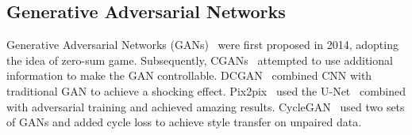 \documentclass[letterpaper]{article} %
\begin{document}











	\subsection{Generative Adversarial Networks}
Generative Adversarial Networks (GANs)~\cite{goodfellow2014generative} were first proposed in 2014, adopting the idea of zero-sum game. Subsequently, CGANs~\cite{mirza2014conditional} attempted to use additional information to make the GAN controllable. DCGAN~\cite{radford2015unsupervised} combined CNN with traditional GAN to achieve a shocking effect. Pix2pix~\cite{isola2017image} used the U-Net~\cite{ronneberger2015u} combined with adversarial training and achieved amazing results. CycleGAN~\cite{zhu2017unpaired} used two sets of GANs and added cycle loss to achieve style transfer on unpaired data.
\end{document}
